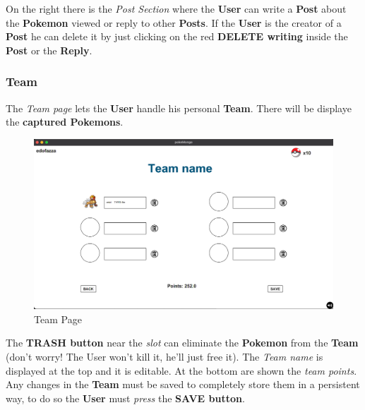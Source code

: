 On the right there is the \textit{Post Section} where the \textbf{User} can write a \textbf{Post} about the \textbf{Pokemon} viewed or reply to other \textbf{Posts}. If the \textbf{User} is the creator of a \textbf{Post} he can delete it by just clicking on the red \textbf{DELETE writing} inside the \textbf{Post} or the \textbf{Reply}.
\subsubsection{Team}
The \textit{Team page} lets the \textbf{User} handle his personal \textbf{Team}.
There will be displaye the \textbf{captured Pokemons}. 
\begin{figure}[H]
	\centering
	\includegraphics[width=\textwidth]{img/userManual/team.png}
	\caption{Team Page}
\end{figure}
The \textbf{TRASH button} near the \textit{slot} can eliminate the \textbf{Pokemon} from the \textbf{Team} (don’t worry! The User won’t kill it, he’ll just free it). The \textit{Team name} is displayed at the top and it is editable. At the bottom are shown the \textit{team points}. Any changes in the \textbf{Team} must be saved to completely store them in a persistent way, to do so the \textbf{User} must \textit{press} the \textbf{SAVE button}.

